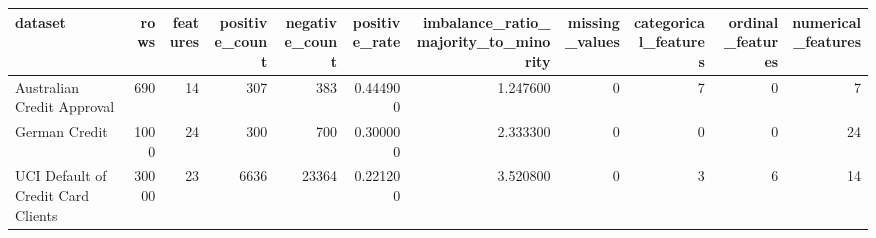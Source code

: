 \begin{tabular}{lrrrrrrrrrr}
\toprule
dataset & rows & features & positive_count & negative_count & positive_rate & imbalance_ratio_majority_to_minority & missing_values & categorical_features & ordinal_features & numerical_features \\
\midrule
Australian Credit Approval & 690 & 14 & 307 & 383 & 0.444900 & 1.247600 & 0 & 7 & 0 & 7 \\
German Credit & 1000 & 24 & 300 & 700 & 0.300000 & 2.333300 & 0 & 0 & 0 & 24 \\
UCI Default of Credit Card Clients & 30000 & 23 & 6636 & 23364 & 0.221200 & 3.520800 & 0 & 3 & 6 & 14 \\
\bottomrule
\end{tabular}
